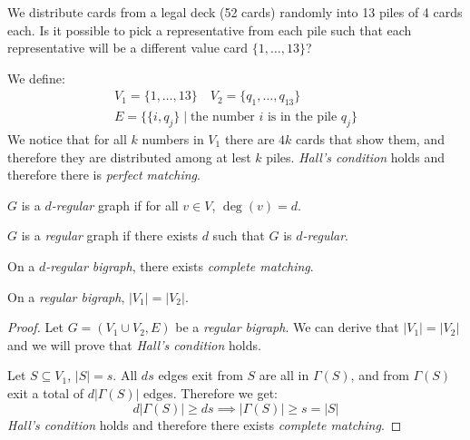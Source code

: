 \documentclass[00_complete]{subfiles}
\begin{document}
\begin{example}
    We distribute cards from a legal deck (52 cards) randomly into 13 piles of
    4 cards each. Is it possible to pick a representative from each pile such
    that each representative will be a different value card $\{1, \dots, 13\}$?

    We define:
    \begin{gather*}
        V_1=\{1,\dots,13\} \quad V_2=\{q_1,\dots,q_{13}\} \\
        E=\{\{i, q_j\} \mid \text{the number $i$ is in the pile $q_j$}\}
    \end{gather*}
    We notice that for all $k$ numbers in $V_1$ there are $4k$ cards that show
    them, and therefore they are distributed among at lest $k$ piles.
    \emph{Hall's condition} holds and therefore there is \emph{perfect
    matching}.
\end{example}
\begin{reminder}
    $G$ is a \emph{$d$-regular} graph if for all $v \in V$, $\deg(v)=d$.

    $G$ is a \emph{regular} graph if there exists $d$ such that $G$ is
    \emph{$d$-regular}.
\end{reminder}
\begin{claim}
    On a \emph{$d$-regular bigraph}, there exists \emph{complete matching}.
\end{claim}
\begin{reminder}
    On a \emph{regular bigraph}, $|V_1|=|V_2|$.
\end{reminder}
\begin{proof}
    Let $G=(V_1\cup V_2,E)$ be a \emph{regular bigraph}. We can derive that
    $|V_1|=|V_2|$ and we will prove that \emph{Hall's condition} holds.

    Let $S \subseteq V_1$, $|S|=s$. All $ds$ edges exit from $S$ are all in
    $\Gamma(S)$, and from $\Gamma(S)$ exit a total of $d|\Gamma(S)|$ edges.
    Therefore we get:
    $$d|\Gamma(S)|\geq ds \implies |\Gamma(S)|\geq s = |S|$$
    \emph{Hall's condition} holds and therefore there exists \emph{complete
    matching}.
\end{proof}
\end{document}
